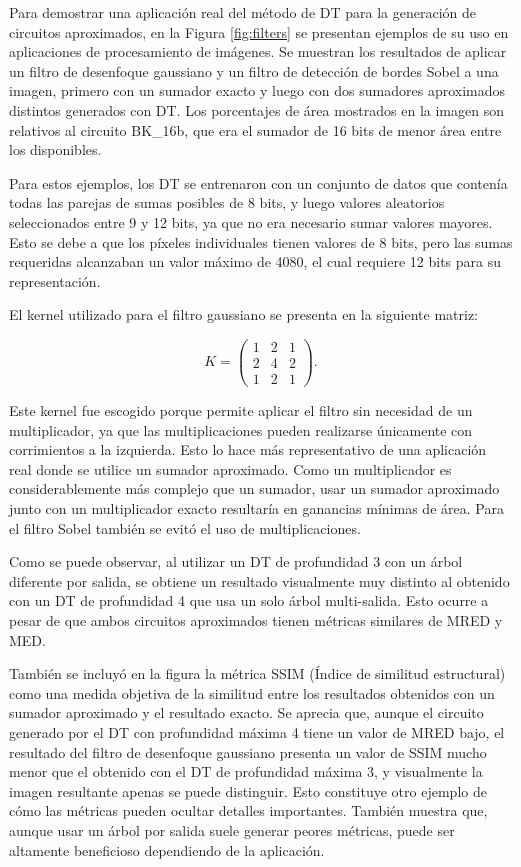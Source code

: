 Para demostrar una aplicación real del método de DT para la generación de
circuitos aproximados, en la Figura \ref{fig:filters} se presentan ejemplos de
su uso en aplicaciones de procesamiento de imágenes. Se muestran los resultados
de aplicar un filtro de desenfoque gaussiano y un filtro de detección de bordes
Sobel a una imagen, primero con un sumador exacto y luego con dos sumadores
aproximados distintos generados con DT. Los porcentajes de área mostrados en la
imagen son relativos al circuito BK\_16b, que era el sumador de 16 bits de menor
área entre los disponibles.

Para estos ejemplos, los DT se entrenaron con un conjunto de datos que contenía
todas las parejas de sumas posibles de 8 bits, y luego valores aleatorios
seleccionados entre 9 y 12 bits, ya que no era necesario sumar valores mayores.
Esto se debe a que los píxeles individuales tienen valores de 8 bits, pero las
sumas requeridas alcanzaban un valor máximo de \num{4080}, el cual requiere 12
bits para su representación.

El kernel utilizado para el filtro gaussiano se presenta en la siguiente matriz:

$$K = \begin{pmatrix} 1 & 2 & 1 \\ 2 & 4 & 2 \\ 1 & 2 & 1 \end{pmatrix}.$$

Este kernel fue escogido porque permite aplicar el filtro sin necesidad de un
multiplicador, ya que las multiplicaciones pueden realizarse únicamente con
corrimientos a la izquierda. Esto lo hace más representativo de una aplicación
real donde se utilice un sumador aproximado. Como un multiplicador es
considerablemente más complejo que un sumador, usar un sumador aproximado junto
con un multiplicador exacto resultaría en ganancias mínimas de área. Para el
filtro Sobel también se evitó el uso de multiplicaciones.

Como se puede observar, al utilizar un DT de profundidad 3 con un árbol
diferente por salida, se obtiene un resultado visualmente muy distinto al
obtenido con un DT de profundidad 4 que usa un solo árbol multi-salida. Esto
ocurre a pesar de que ambos circuitos aproximados tienen métricas similares de
MRED y MED.

También se incluyó en la figura la métrica SSIM (Índice de similitud
estructural) como una medida objetiva de la similitud entre los resultados
obtenidos con un sumador aproximado y el resultado exacto. Se aprecia que,
aunque el circuito generado por el DT con profundidad máxima 4 tiene un valor
de MRED bajo, el resultado del filtro de desenfoque gaussiano presenta un valor
de SSIM mucho menor que el obtenido con el DT de profundidad máxima 3, y
visualmente la imagen resultante apenas se puede distinguir. Esto constituye
otro ejemplo de cómo las métricas pueden ocultar detalles importantes. También
muestra que, aunque usar un árbol por salida suele generar peores métricas,
puede ser altamente beneficioso dependiendo de la aplicación.

